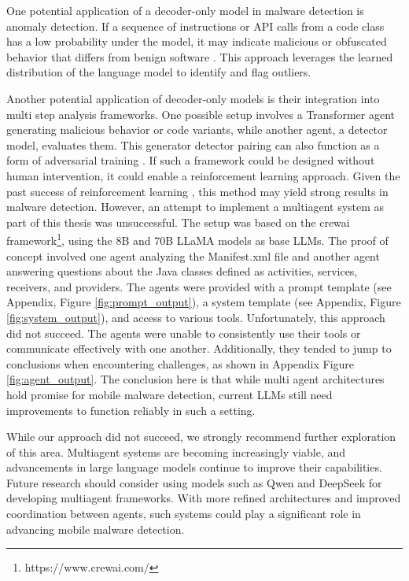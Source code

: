 One potential application of a decoder-only model in malware detection is anomaly detection.
If a sequence of instructions or API calls from a code class has a low probability under the model, 
it may indicate malicious or obfuscated behavior that differs from benign software 
\cite{tbased_anomalydetection, anomalybased_classification}.
This approach leverages the learned distribution of the language model to identify and flag outliers.

Another potential application of decoder-only models is their integration into multi step analysis frameworks.
One possible setup involves a Transformer agent generating malicious behavior or code variants, 
while another agent, a detector model, evaluates them.
This generator detector pairing can also function as a form of adversarial training \cite{adversarial_training}.
If such a framework could be designed without human intervention, it could enable a reinforcement learning approach.
Given the past success of reinforcement learning \cite{deepseek, alphago}, 
this method may yield strong results in malware detection.
However, an attempt to implement a multiagent system as part of this thesis was unsuccessful.
The setup was based on the crewai framework\footnote{https://www.crewai.com/}, 
using the 8B and 70B LLaMA models \cite{llama3modelcard} as base LLMs.
The proof of concept involved one agent analyzing the Manifest.xml 
file and another agent answering questions about the Java classes defined as activities, services, receivers, and providers.
The agents were provided with a prompt template 
(see Appendix, Figure \ref{fig:prompt_output}), 
a system template (see Appendix, Figure \ref{fig:system_output}), and access to various tools.
Unfortunately, this approach did not succeed.
The agents were unable to consistently use their tools or communicate effectively with one another.
Additionally, they tended to jump to conclusions when encountering challenges, 
as shown in Appendix Figure \ref{fig:agent_output}.
The conclusion here is that while multi agent architectures hold promise 
for mobile malware detection, current LLMs still need improvements to function reliably in such a setting.

While our approach did not succeed, we strongly recommend further exploration of this area.
Multiagent systems are becoming increasingly viable, 
and advancements in large language models continue to improve their capabilities.
Future research should consider using models such as 
Qwen \cite{qwen} and DeepSeek \cite{deepseek} for developing multiagent frameworks.
With more refined architectures and improved coordination between agents, 
such systems could play a significant role in advancing mobile malware detection.

